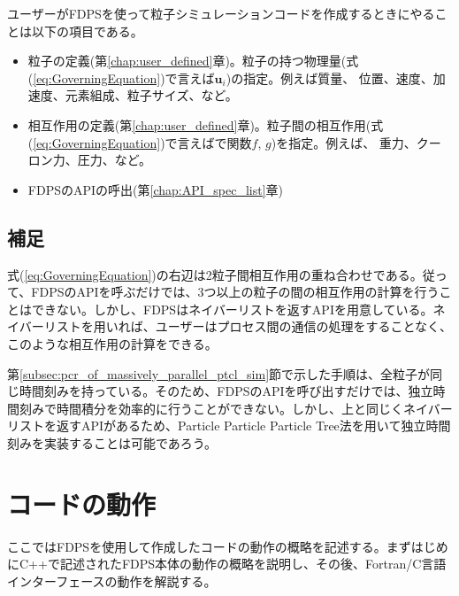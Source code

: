 ユーザーがFDPSを使って粒子シミュレーションコードを作成するときにやるこ
とは以下の項目である。
\begin{itemize}


    
\item 粒子の定義(第\ref{chap:user_defined}章)。粒子の持つ物理量(式
  (\ref{eq:GoverningEquation})で言えば$\bm{u}_i$)の指定。例えば質量、
  位置、速度、加速度、元素組成、粒子サイズ、など。

\item 相互作用の定義(第\ref{chap:user_defined}章)。粒子間の相互作用(式
  (\ref{eq:GoverningEquation})で言えばで関数$f$, $g$)を指定。例えば、
  重力、クーロン力、圧力、など。

\item FDPSのAPIの呼出(第\ref{chap:API_spec_list}章)

\end{itemize}

\subsection{補足}

式(\ref{eq:GoverningEquation})の右辺は2粒子間相互作用の重ね合わせである。従って、FDPSのAPIを呼ぶだけでは、3つ以上の粒子の間の相互作用の計算を行うことはできない。しかし、FDPSはネイバーリストを返すAPIを用意している。ネイバーリストを用いれば、ユーザーはプロセス間の通信の処理をすることなく、このような相互作用の計算をできる。

第\ref{subsec:pcr_of_massively_parallel_ptcl_sim}節で示した手順は、全粒子が同じ時間刻みを持っている。そのため、FDPSのAPIを呼び出すだけでは、独立時間刻みで時間積分を効率的に行うことができない。しかし、上と同じくネイバーリストを返すAPIがあるため、Particle Particle Particle Tree法を用いて独立時間刻みを実装することは可能であろう。


\section{コードの動作}
\label{sec:overview_action}
ここではFDPSを使用して作成したコードの動作の概略を記述する。まずはじめにC++で記述されたFDPS本体の動作の概略を説明し、その後、Fortran/C言語 インターフェースの動作を解説する。
